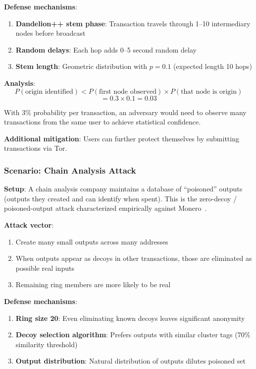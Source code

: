 \textbf{Defense mechanisms}:
\begin{enumerate}
  \item \textbf{Dandelion++ stem phase}: Transaction travels through 1--10
    intermediary nodes before broadcast
  \item \textbf{Random delays}: Each hop adds 0--5 second random delay
  \item \textbf{Stem length}: Geometric distribution with $p = 0.1$
    (expected length 10 hops)
\end{enumerate}

\textbf{Analysis}:
\[
P(\text{origin identified}) < P(\text{first node observed}) \times P(\text{that node is origin})
\]
\[
= 0.3 \times 0.1 = 0.03
\]

With 3\% probability per transaction, an adversary would need to observe
many transactions from the same user to achieve statistical confidence.

\textbf{Additional mitigation}: Users can further protect themselves by
submitting transactions via Tor.

\subsubsection{Scenario: Chain Analysis Attack}

\textbf{Setup}: A chain analysis company maintains a database of
``poisoned'' outputs (outputs they created and can identify when spent).
This is the zero-decoy / poisoned-output attack characterized empirically
against Monero~\cite{monerotracing}.

\textbf{Attack vector}:
\begin{enumerate}
  \item Create many small outputs across many addresses
  \item When outputs appear as decoys in other transactions, those are
    eliminated as possible real inputs
  \item Remaining ring members are more likely to be real
\end{enumerate}

\textbf{Defense mechanisms}:
\begin{enumerate}
  \item \textbf{Ring size 20}: Even eliminating known decoys leaves
    significant anonymity
  \item \textbf{Decoy selection algorithm}: Prefers outputs with similar
    cluster tags (70\% similarity threshold)
  \item \textbf{Output distribution}: Natural distribution of outputs
    dilutes poisoned set
\end{enumerate}

